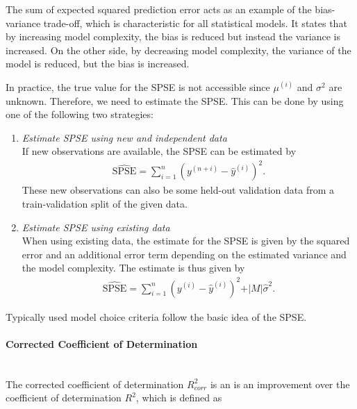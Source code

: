 \documentclass[10pt,a4paper]{report}
\newcommand{\subsubsubsection}[1]{\paragraph{#1}\mbox{}\\}
\begin{document}
The sum of expected squared prediction error acts as an example of the bias-variance trade-off, which is characteristic for all statistical models. It states that by increasing model complexity, the bias is reduced but instead the variance is increased. On the other side, by decreasing model complexity, the variance of the model is reduced, but the bias is increased. \cite{bishop2006patternRecognition}


In practice, the true value for the SPSE is not accessible since $\mu^{(i)}$ and $\sigma^2$ are unknown. Therefore, we need to estimate the SPSE. This can be done by using one of the following two strategies:

\begin{enumerate}

	\item \emph{Estimate SPSE using new and independent data} \\	
	If new observations are available, the SPSE can be estimated by
	\begin{align}
		\widehat{\text{SPSE}} = \sum_{i=1}^n (y^{(n+i)} - \hat y^{(i)})^2.
	\end{align}
	These new observations can also be some held-out validation data from a train-validation split of the given data. 
	
	\item \emph{Estimate SPSE using existing data} \\
	When using existing data, the estimate for the SPSE is given by the squared error and an additional error term depending on the estimated variance and the model complexity. The estimate is thus given by
	\begin{align}
		\widehat{\text{SPSE}} = \sum_{i=1}^n(y^{(i)} - \hat y^{(i)})^2 + \vert M \vert \hat \sigma^2.
	\end{align}

\end{enumerate}


Typically used model choice criteria follow the basic idea of the SPSE. \cite{fahrmeir2013regression}

\subsubsubsection{Corrected Coefficient of Determination}

The corrected coefficient of determination $R^2_{corr}$ is an is an improvement over the coefficient of determination $R^2$, which is defined as 
\end{document}
